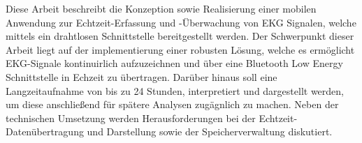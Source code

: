 \onehalfspacing
 {\Large Diese Arbeit beschreibt die Konzeption sowie Realisierung einer mobilen Anwendung zur Echtzeit-Erfassung
 	und -Überwachung von EKG Signalen, welche mittels ein drahtlosen Schnittstelle bereitgestellt werden. Der Schwerpunkt dieser Arbeit liegt auf der implementierung einer robusten Lösung, welche es ermöglicht EKG-Signale kontinuirlich aufzuzeichnen und über eine Bluetooth Low Energy Schnittstelle in Echzeit zu
 	übertragen. Darüber hinaus soll eine Langzeitaufnahme von bis zu 24 Stunden, interpretiert und dargestellt werden, um diese anschließend für spätere Analysen zugägnlich zu machen. Neben der technischen Umsetzung werden Herausforderungen bei der Echtzeit-Datenübertragung und Darstellung sowie der Speicherverwaltung diskutiert. \par }

